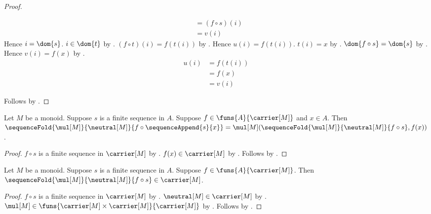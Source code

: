 \begin{proof}
\begin{subproof}
\begin{byCase}
\begin{align*}
                    &= (f\circ s)(i)
                    \\
                    &= v(i)
            \end{align*}
            Hence $i=\dom{s}$.
            $i\in\dom{t}$ by
                .
            $(f\circ t)(i)=f(t(i))$ by
                .
            Hence $u(i)=f(t(i))$.
            $t(i)=x$ by .
            $\dom{f\circ s}=\dom{s}$ by
                .
            Hence $v(i)=f(x)$ by
                .
            \begin{align*}
                u(i)
                    &= f(t(i))
                    \\
                    &= f(x)
                    \\
                    &= v(i)
            \end{align*}
        \end{byCase}
    \end{subproof}
    Follows by .
\end{proof}

\begin{proposition}\label{monoid_mapped_append_fold}
    Let $M$ be a monoid.
    Suppose $s$ is a finite sequence in $A$.
    Suppose $f\in\funs{A}{\carrier[M]}$ and $x\in A$.
    Then
        $\sequenceFold{\mul[M]}{\neutral[M]}{
            f\circ\sequenceAppend{s}{x}}
        =\mul[M]
            (\sequenceFold{\mul[M]}{\neutral[M]}{f\circ s},f(x))$.
\end{proposition}
\begin{proof}
    $f\circ s$ is a finite sequence in $\carrier[M]$ by
        .
    $f(x)\in\carrier[M]$ by .
    Follows by
        .
\end{proof}

\begin{proposition}\label{monoid_mapped_fold_type}
    Let $M$ be a monoid.
    Suppose $s$ is a finite sequence in $A$.
    Suppose $f\in\funs{A}{\carrier[M]}$.
    Then
        $\sequenceFold{\mul[M]}{\neutral[M]}{f\circ s}
            \in\carrier[M]$.
\end{proposition}
\begin{proof}
    $f\circ s$ is a finite sequence in $\carrier[M]$ by
        .
    $\neutral[M]\in\carrier[M]$ by
        .
    $\mul[M]\in
        \funs{\carrier[M]\times\carrier[M]}{\carrier[M]}$ by
        .
    Follows by .
\end{proof}

